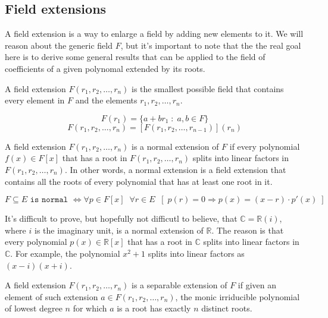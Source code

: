 
\subsection{Field extensions}
A field extension is a way to enlarge a field by adding new elements to it. We 
will reason about the generic field $F$, but it's important to note that the
the real goal here is to derive some general results that can be applied to
the field of coefficients of a given polynomal extended by its roots.

\begin{definition}
    A field extension $F(r_1, r_2, \dots, r_n)$ is the smallest possible 
    field that contains every element in $F$ and the elements $r_1, r_2, \dots, r_n$.

    $$ F(r_1) = \{ a + br_1 \;:\; a,b \in F \} $$
    $$ F(r_1, r_2, \dots, r_n) = [F(r_1, r_2, \dots, r_{n-1})](r_n) $$
\end{definition} \vspace{0.2em}

\begin{definition}
    A field extension $F(r_1, r_2, \dots, r_n)$ is a normal extension of $F$ if every
    polynomial $f(x) \in F[x]$ that has a root in $F(r_1, r_2, \dots, r_n)$ splits 
    into linear factors in $F(r_1, r_2, \dots, r_n)$. In other words, a normal extension is a
    field extension that contains all the roots of every polynomial that has at least 
    one root in it.

    $$ F \subseteq E \texttt{ is normal } 
        \iff \forall p \in F[x] \;\;\forall r \in E\;\; 
        [\;p(r) = 0 \Rightarrow p(x) = (x - r) \cdot p'(x)\;]
    $$
\end{definition} \vspace{0.2em}

\begin{example}
    It's difficult to prove, but hopefully not difficutl to believe, that $\mathbb{C} = \mathbb{R}(i)$, 
    where $i$ is the imaginary unit, is a normal extension of $\mathbb{R}$. The reason is that 
    every polynomial $p(x) \in \mathbb{R}[x]$ that has a root in $\mathbb{C}$ splits into linear
    factors in $\mathbb{C}$. For example, the polynomial $x^2 + 1$ splits into linear 
    factors as $(x - i)(x + i)$. \\
\end{example}

\begin{definition}
    A field extension $F(r_1, r_2, \dots, r_n)$ is a separable extension of $F$ if given 
    an element of such extension $a \in F(r_1, r_2, \dots, r_n)$, the monic irriducible polynomial 
    of lowest degree $n$ for which $a$ is a root has exactly $n$ distinct roots.
\end{definition} \vspace{0.2em}

